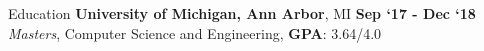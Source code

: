 \documentclass{resume} %
\begin{document}

\begin{rSection}{Education}
\vspace*{-0.2cm}
\textbf{University of Michigan, Ann Arbor}, MI \hfill \textbf{Sep `17 - Dec `18}\\
\hspace*{1pt} \textit{Masters}, Computer Science and Engineering, {\small \textbf{GPA}: 3.64/4.0}
\vspace{2pt}


\end{rSection}
\end{document}
